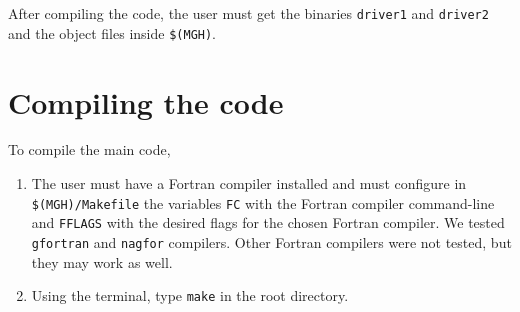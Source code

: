 \documentclass[11pt]{article}
\begin{document}

\vspace{1em}

After compiling the code, the user must get the binaries
\verb|driver1| and \verb|driver2| and the object files inside
\verb|$(MGH)|.

\section{Compiling the code}

To compile the main code,

\begin{enumerate}

\item The user must have a Fortran compiler installed and must
  configure in \verb|$(MGH)/Makefile| the variables \verb|FC| with the
  Fortran compiler command-line and \verb|FFLAGS| with the desired
  flags for the chosen Fortran compiler. We tested \verb|gfortran| and
  \verb|nagfor| compilers. Other Fortran compilers were not tested,
  but they may work as well.

\item Using the terminal, type \verb|make| in the root directory.

\end{enumerate}
\end{document}
